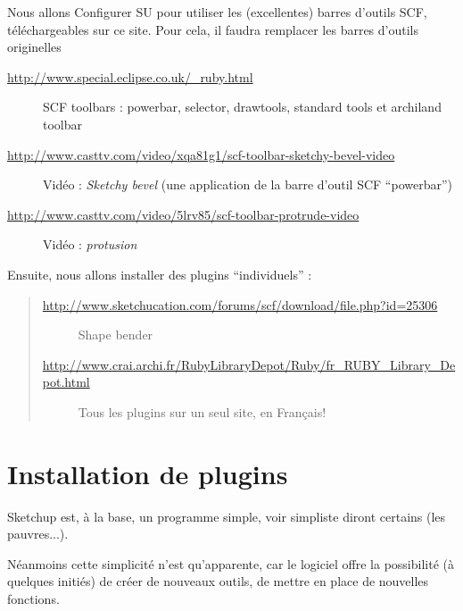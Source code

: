 \documentclass[a4paper,12pt,french]{sphinxmanual}
\begin{document}
Nous allons Configurer SU pour utiliser les (excellentes) barres d'outils SCF, téléchargeables sur ce site. Pour cela, il faudra remplacer les barres d'outils originelles



\begin{description}
\item[{\url{http://www.special.eclipse.co.uk/\_ruby.html}}] \leavevmode
SCF toolbars : powerbar, selector, drawtools, standard tools et archiland toolbar

\item[{\url{http://www.casttv.com/video/xqa81g1/scf-toolbar-sketchy-bevel-video}}] \leavevmode
Vidéo : \emph{Sketchy bevel} (une application de la barre d'outil SCF ``powerbar'')

\item[{\url{http://www.casttv.com/video/5lrv85/scf-toolbar-protrude-video}}] \leavevmode
Vidéo : \emph{protusion}

\end{description}



Ensuite, nous allons installer des plugins ``individuels'' :
\begin{quote}
\begin{description}
\item[{\url{http://www.sketchucation.com/forums/scf/download/file.php?id=25306}}] \leavevmode
Shape bender

\item[{\url{http://www.crai.archi.fr/RubyLibraryDepot/Ruby/fr\_RUBY\_Library\_Depot.html}}] \leavevmode
Tous les plugins sur un seul site, en Français!

\end{description}
\end{quote}


\section{Installation de plugins}
\label{su/install-plugin-su:installation-de-plugins}\label{su/install-plugin-su::doc}\label{su/install-plugin-su:install-plugin-su}
Sketchup est, à la base, un programme simple, voir simpliste diront certains (les pauvres...).

Néanmoins cette simplicité n'est qu'apparente, car le logiciel offre la possibilité (à quelques initiés) de créer de nouveaux outils, de mettre en place de nouvelles fonctions.
\end{document}
